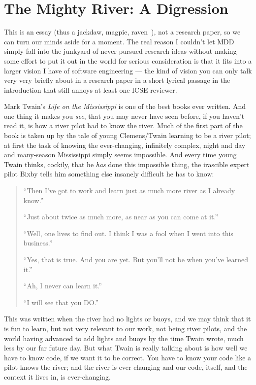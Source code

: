 \documentclass[sigplan,screen]{acmart}
\begin{document}
\section{The Mighty River: A Digression}

This is an essay (thus a jackdaw, magpie, raven~\cite{doyleessay}), not a research paper, so we can turn our minds aside
for a moment.  The real reason I couldn't let MDD simply fall into the
junkyard of never-pursued research ideas without making some effort to put it
out in the world for serious consideration is that it fits into a
larger vision I have of software engineering --- the kind of vision you
can only talk very very briefly about in a research paper in a short lyrical passage in the
introduction that still annoys at least one ICSE reviewer.

Mark Twain's \emph{Life on the Mississippi} is one of the best books
ever written.  And one thing it makes you \emph{see}, that you may
never have seen before, if you haven't read it, is how a river pilot
had to know the river.  Much of the first part of the book is taken up
by the tale of young Clemens/Twain learning to be a river pilot; at
first the task of knowing the ever-changing, infinitely complex, night
and day and many-season Mississippi simply seems impossible.  And
every time young Twain thinks, cockily, that he \emph{has} done this
impossible thing, the irascible expert pilot Bixby tells him something
else insanely difficult he has to know:

\begin{quote}
``Then I've got to work and learn just as much more river as I already
know.''

``Just about twice as much more, as near as you can come at it.''

``Well, one lives to find out.  I think I was a fool when I went into
this business.''

``Yes, that is true.  And you are yet.  But you'll not be when you've
learned it.''

``Ah, I never can learn it.''

``I will see that you DO.''
\end{quote}

This was written when the river had no lights or buoys, and we may
think that it is fun to learn, but not very relevant to  our work, not
being river pilots, and the world having advanced to add lights and
buoys by the time Twain wrote, much less by our far future day.  But
what Twain is really talking about is how well we have to know code,
if we want it to be correct.  You have to know your code like a pilot
knows the river; and the river is ever-changing and our code, itself,
and the context it lives in, is ever-changing.
\end{document}
